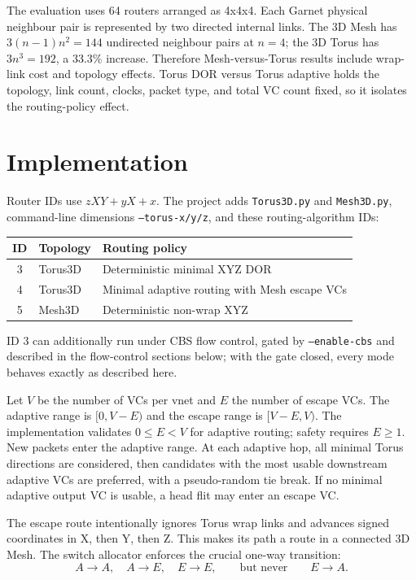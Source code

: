 \documentclass[10pt]{article}
\begin{document}
The evaluation uses 64 routers arranged as 4x4x4. Each Garnet physical
neighbour pair is represented by two directed internal links. The 3D Mesh has
$3(n-1)n^2=144$ undirected neighbour pairs at $n=4$; the 3D Torus has
$3n^3=192$, a 33.3\% increase. Therefore Mesh-versus-Torus results include
wrap-link cost and topology effects. Torus DOR versus Torus adaptive holds the
topology, link count, clocks, packet type, and total VC count fixed, so it
isolates the routing-policy effect.

\section{Implementation}
Router IDs use $zXY+yX+x$. The project adds \texttt{Torus3D.py} and
\texttt{Mesh3D.py}, command-line dimensions \texttt{--torus-x/y/z}, and these
routing-algorithm IDs:

\begin{center}
\begin{tabular}{cll}
\toprule
ID & Topology & Routing policy \\
\midrule
3 & Torus3D & Deterministic minimal XYZ DOR \\
4 & Torus3D & Minimal adaptive routing with Mesh escape VCs \\
5 & Mesh3D & Deterministic non-wrap XYZ \\
\bottomrule
\end{tabular}
\end{center}

ID 3 can additionally run under CBS flow control, gated by
\texttt{--enable-cbs} and described in the flow-control sections below; with
the gate closed, every mode behaves exactly as described here.

Let $V$ be the number of VCs per vnet and $E$ the number of escape VCs. The
adaptive range is $[0,V-E)$ and the escape range is $[V-E,V)$. The
implementation validates $0 \le E < V$ for adaptive routing; safety requires
$E \ge 1$. New packets enter the adaptive range. At each adaptive hop, all
minimal Torus directions are considered, then candidates with the most usable
downstream adaptive VCs are preferred, with a pseudo-random tie break. If no
minimal adaptive output VC is usable, a head flit may enter an escape VC.

The escape route intentionally ignores Torus wrap links and advances signed
coordinates in X, then Y, then Z. This makes its path a route in a connected
3D Mesh. The switch allocator enforces the crucial one-way transition:
\[
  A\!\rightarrow\!A,\quad A\!\rightarrow\!E,\quad E\!\rightarrow\!E,
  \qquad\text{but never}\qquad E\!\rightarrow\!A.
\]
\end{document}
